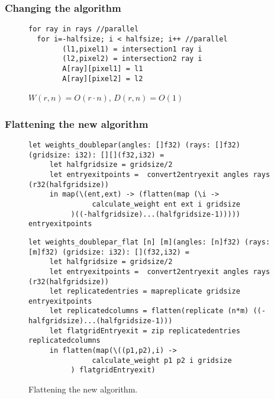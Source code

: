 \documentclass{beamer}
\begin{document}
\begin{frame}[fragile]
\frametitle{Changing the algorithm}
\begin{figure}[!h]
\begin{lstlisting}[frame=single]
for ray in rays //parallel
  for i=-halfsize; i < halfsize; i++ //parallel
        (l1,pixel1) = intersection1 ray i
        (l2,pixel2) = intersection2 ray i
        A[ray][pixel1] = l1
        A[ray][pixel2] = l2
\end{lstlisting}
  \caption{$W(r,n)=O(r\cdot n)$, $D(r,n)=O(1)$}
\end{figure}
\end{frame}

\begin{frame}[fragile]
\frametitle{Flattening the new algorithm}
\begin{figure}[!h]
\begin{lstlisting}[frame=single, language=Futhark,basicstyle=\tiny]
let weights_doublepar(angles: []f32) (rays: []f32) (gridsize: i32): [][](f32,i32) =
     let halfgridsize = gridsize/2
     let entryexitpoints =  convert2entryexit angles rays (r32(halfgridsize))
     in map(\(ent,ext) -> (flatten(map (\i ->
               calculate_weight ent ext i gridsize
          )((-halfgridsize)...(halfgridsize-1))))) entryexitpoints
\end{lstlisting}
\begin{lstlisting}[frame=single, language=Futhark,basicstyle=\tiny]
let weights_doublepar_flat [n] [m](angles: [n]f32) (rays: [m]f32) (gridsize: i32): [](f32,i32) =
     let halfgridsize = gridsize/2
     let entryexitpoints =  convert2entryexit angles rays (r32(halfgridsize))
     let replicatedentries = mapreplicate gridsize entryexitpoints
     let replicatedcolumns = flatten(replicate (n*m) ((-halfgridsize)...(halfgridsize-1)))
     let flatgridEntryexit = zip replicatedentries replicatedcolumns
     in flatten(map(\((p1,p2),i) ->
               calculate_weight p1 p2 i gridsize
          ) flatgridEntryexit)
\end{lstlisting}
  \caption{Flattening the new algorithm.}
\end{figure}
\end{frame}

 \begin{frame}
 \nocite{*}
 
 
 \end{frame}
\end{document}

